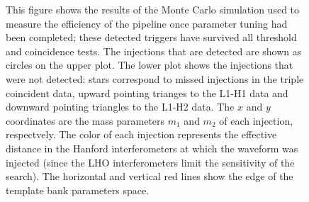 \begin{figure}[p]
{\label{f:m1m2_found_missed}%
This figure shows the results of the Monte Carlo simulation used to measure
the efficiency of the pipeline once parameter tuning had been completed; these
detected triggers have survived all threshold and coincidence tests.  The
injections that are detected are shown as circles on the upper plot.  The
lower plot shows the injections that were not detected: stars correspond to
missed injections in the triple coincident data, upward pointing trianges to
the L1-H1 data and downward pointing triangles to the L1-H2 data. The $x$ and
$y$ coordinates are the mass parameters $m_1$ and $m_2$ of each injection,
respectvely. The color of each injection represents the effective distance in
the Hanford interferometers at which the waveform was injected (since the LHO
interferometers limit the sensitivity of the search).  The horizontal and
vertical red lines show the edge of the template bank parameters space. 
}
\end{figure}

